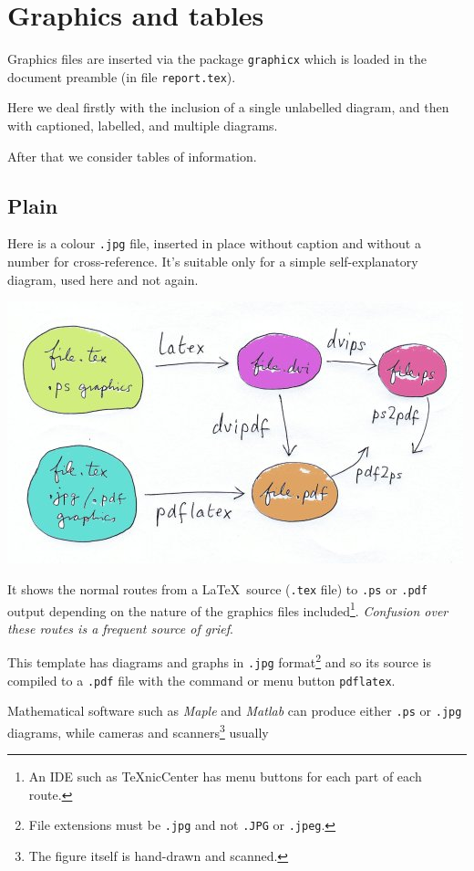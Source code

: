 \chapter{Graphics and tables}\label{sec:graphics}
Graphics files are inserted via the package \texttt{graphicx} which is
loaded in the document preamble (in file \texttt{report.tex}).
\par
Here we deal firstly with the inclusion of a single unlabelled diagram,
and then with captioned, labelled, and multiple diagrams.
\par
After that we consider tables of information.
%
\section{Plain}
Here is a colour \texttt{.jpg} file, inserted in place without caption
and without a number for cross-reference. It's suitable only for a
simple self-explanatory diagram, used here and not again.
\begin{center}
\includegraphics[width=.7\textwidth]{pic1.jpg}
\end{center}
It shows the normal routes from a \LaTeX\ source (\texttt{.tex} file) to
\texttt{.ps} or \texttt{.pdf} output depending on the nature of the
graphics files included\footnote{An IDE such as TeXnicCenter has menu
buttons for each part of each route.}. \textit{Confusion over these
routes is a frequent source of grief}.
\par
This template has diagrams and graphs in \texttt{.jpg}
format\footnote{File extensions must be \texttt{.jpg} and not
\texttt{.JPG} or \texttt{.jpeg}.} and so its source is compiled to a
\texttt{.pdf} file with the command or menu button \texttt{pdflatex}.
\par
Mathematical software such as \textsl{Maple} and \textsl{Matlab} can
produce either \texttt{.ps} or \texttt{.jpg} diagrams, while cameras and
scanners\footnote{The figure itself is hand-drawn and scanned.} usually
